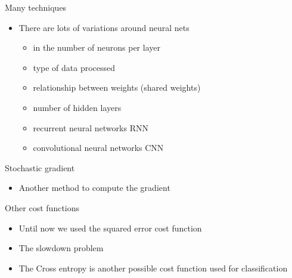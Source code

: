 \documentclass{beamer}
\begin{document}
\begin{frame}{Many techniques}
    \begin{itemize}
        \item There are lots of variations around neural nets
            \begin{itemize}
                \item in the number of neurons per layer
                    \item type of data processed
                    \item relationship between weights (shared weights)
                        \item number of hidden layers
                        \item recurrent neural networks RNN
                            \item convolutional neural networks CNN
            \end{itemize}
    \end{itemize}
\end{frame}

\begin{frame}{Stochastic gradient}
    \begin{itemize}
        \item Another method to compute the gradient
    \end{itemize}
\end{frame}


\begin{frame}{Other cost functions}
   \begin{itemize}
       \item  Until now we used the squared error cost function
           \item The slowdown problem
               \item The Cross entropy is another possible cost function used
                   for classification
   \end{itemize} 
\end{frame}
\end{document}
